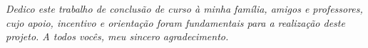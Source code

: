 \begin{dedicatoria}
   \vspace*{\fill}
   \centering
   \noindent
   \textit{Dedico este trabalho de conclusão de curso à minha família, amigos e professores, cujo apoio, incentivo e orientação foram fundamentais para a realização deste projeto. A todos vocês, meu sincero agradecimento.} \vspace*{\fill}
\end{dedicatoria}

